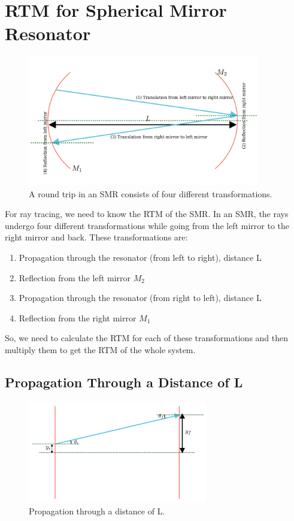 \documentclass[12pt]{article}
\begin{document}
\section{RTM for Spherical Mirror Resonator}
\begin{figure}[h]
    \centering
    \includegraphics[width=0.9\textwidth]{images/round_trip.png}
    \caption{A round trip in an SMR consists of four different transformations.}
    \label{fig:round-trip}
\end{figure}

For ray tracing, we need to know the RTM of the SMR. In an SMR, the rays undergo four different transformations while going from the left mirror to the right mirror and back. These transformations are:
\begin{enumerate}
    \item Propagation through the resonator (from left to right), distance L
    \item Reflection from the left mirror \(M_2\)
    \item Propagation through the resonator (from right to left), distance L
    \item Reflection from the right mirror \(M_1\)
\end{enumerate}

So, we need to calculate the RTM for each of these transformations and then multiply them to get the RTM of the whole system.

\subsection{Propagation Through a Distance of L}
\begin{figure}[h]
    \centering
    \includegraphics[width=0.7\textwidth]{images/translation.png}
    \caption{Propagation through a distance of L.}
    \label{fig:translation}
\end{figure}
\end{document}
